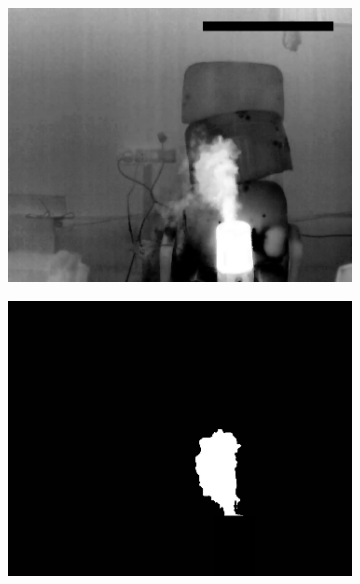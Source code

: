 \documentclass[14pt, a4paper]{extreport}
\begin{document}
\begin{figure}[h!]
\begin{subfigure}{.32\textwidth}
			\includegraphics[width = \textwidth]{image/chapter_3/examples/tep/214}
		\end{subfigure}
		\begin{subfigure}{.32\textwidth}
			\centering
			\includegraphics[width = \textwidth]{image/chapter_3/examples/mask/214}
		\end{subfigure}
		\begin{subfigure}{.32\textwidth}
			\centering

\end{subfigure}
\end{figure}
\end{document}
